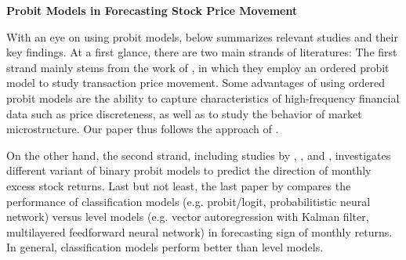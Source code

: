 \par
{\noindent\bfseries Probit Models in Forecasting Stock Price Movement}


With an eye on using probit models,  below summarizes relevant studies and their key findings. At a first glance, there are two main strands of literatures: The first strand mainly stems from the work of \citet{hausman1992}, in which they employ an ordered probit model to study transaction price movement. Some advantages of using ordered probit models are the ability to capture characteristics of high-frequency financial data such as price discreteness, as well as to study the behavior of market microstructure. Our paper thus follows the approach of \citet{hausman1992}. 

On the other hand, the second strand, including studies by \citet{nyberg2011}, \citet{nybergponka2016}, and \citet{ponka2017}, investigates different variant of binary probit models to predict the direction of monthly excess stock returns. Last but not least, the last paper by \citet{leungetal2000} compares the performance of classification models (e.g. probit/logit, probabilitistic neural network) versus level models (e.g. vector autoregression with Kalman filter, multilayered feedforward neural network) in forecasting sign of monthly returns. In general, classification models perform better than level models. 



